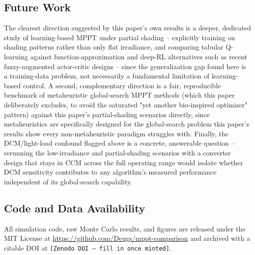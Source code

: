 \subsection{Future Work}
The clearest direction suggested by this paper's own results is a deeper,
dedicated study of learning-based MPPT under partial shading -- explicitly
training on shading patterns rather than only flat irradiance, and
comparing tabular Q-learning against function-approximation and deep-RL
alternatives such as recent fuzzy-augmented actor-critic designs
\cite{ortizmunoz2025hybrid} -- since the generalization gap found here is a
training-data problem, not necessarily a fundamental limitation of
learning-based control.
A second, complementary direction is a fair, reproducible benchmark of
metaheuristic global-search MPPT methods (which this paper deliberately
excludes, to avoid the saturated "yet another bio-inspired optimizer"
pattern) against this paper's partial-shading scenarios directly, since
metaheuristics are specifically designed for the global-search problem this
paper's results show every non-metaheuristic paradigm struggles with.
Finally, the DCM/light-load confound flagged above is a concrete,
answerable question -- rerunning the low-irradiance and partial-shading
scenarios with a converter design that stays in CCM across the full
operating range would isolate whether DCM sensitivity contributes to any
algorithm's measured performance independent of its global-search
capability.

\subsection*{Code and Data Availability}
All simulation code, raw Monte Carlo results, and figures are released
under the MIT License at \url{https://github.com/Deugs/mppt-comparison}
and archived with a citable DOI at \texttt{[Zenodo DOI -- fill in once
minted]}.
